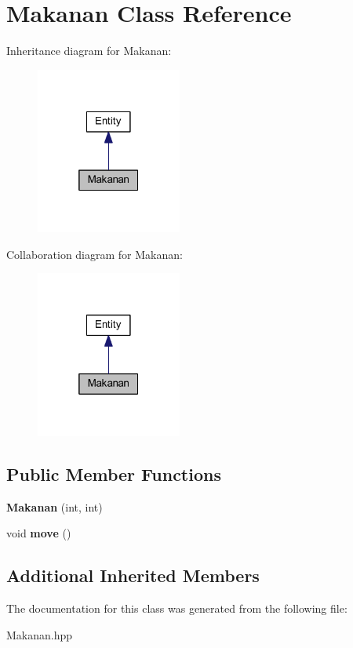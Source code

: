 \hypertarget{class_makanan}{}\section{Makanan Class Reference}
\label{class_makanan}


Inheritance diagram for Makanan\+:
\nopagebreak
\begin{figure}[H]
\begin{center}
\leavevmode
\includegraphics[width=136pt]{class_makanan__inherit__graph}
\end{center}
\end{figure}


Collaboration diagram for Makanan\+:
\nopagebreak
\begin{figure}[H]
\begin{center}
\leavevmode
\includegraphics[width=136pt]{class_makanan__coll__graph}
\end{center}
\end{figure}
\subsection*{Public Member Functions}
\begin{DoxyCompactItemize}
\item 
\mbox{\label{class_makanan_aa3e4801d7e413401c502e1b6fa4e994a}} 
{\bfseries Makanan} (int, int)
\item 
\mbox{\label{class_makanan_a02f224d8090f673bb67a2191d3b992ae}} 
void {\bfseries move} ()
\end{DoxyCompactItemize}
\subsection*{Additional Inherited Members}


The documentation for this class was generated from the following file\+:\begin{DoxyCompactItemize}
\item 
Makanan.\+hpp\end{DoxyCompactItemize}
